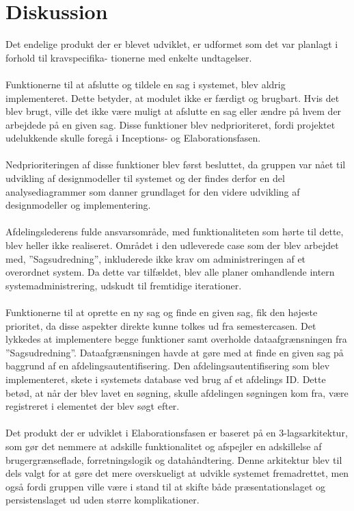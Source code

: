 \chapter{Diskussion}
Det endelige produkt der er blevet udviklet, er udformet som det var planlagt i forhold til kravspecifika- tionerne med enkelte undtagelser. \\ \\
Funktionerne til at afslutte og tildele en sag i systemet, blev aldrig implementeret. 
Dette betyder, at modulet ikke er færdigt og brugbart. 
Hvis det blev brugt, ville det ikke være muligt at afslutte en sag eller ændre på hvem der arbejdede på en given sag. 
Disse funktioner blev nedprioriteret, fordi projektet udelukkende skulle foregå i Inceptions- og Elaborationsfasen. \\ \\
Nedprioriteringen af disse funktioner blev først besluttet, da gruppen var nået til udvikling af designmodeller til systemet og der findes derfor en del analysediagrammer som danner grundlaget for den videre udvikling af designmodeller og implementering. \\ \\
Afdelingslederens fulde ansvarsområde, med funktionaliteten som hørte til dette, blev heller ikke realiseret. 
Området i den udleverede case som der blev arbejdet med, ”Sagsudredning”, inkluderede ikke krav om administreringen af et overordnet system. 
Da dette var tilfældet, blev alle planer omhandlende intern systemadministrering, udskudt til fremtidige iterationer. \\ \\
Funktionerne til at oprette en ny sag og finde en given sag, fik den højeste prioritet, da disse aspekter direkte kunne tolkes ud fra semestercasen. 
Det lykkedes at implementere begge funktioner samt overholde dataafgrænsningen fra ”Sagsudredning”. 
Dataafgrænsningen havde at gøre med at finde en given sag på baggrund af en afdelingsautentifisering. 
Den afdelingsautentifisering som blev implementeret, skete i systemets database ved brug af et afdelings ID. 
Dette betød, at når der blev lavet en søgning, skulle afdelingen søgningen kom fra, være registreret i elementet der blev søgt efter. \\ \\
Det produkt der er udviklet i Elaborationsfasen er baseret på en 3-lagsarkitektur, som gør det nemmere at adskille funktionalitet og afspejler en adskillelse af brugergrænseflade, forretningslogik og datahåndtering. 
Denne arkitektur blev til dels valgt for at gøre det mere overskueligt at udvikle systemet fremadrettet, men også fordi gruppen ville være i stand til at skifte både præsentationslaget og persistenslaget ud uden større komplikationer. \\ \\
